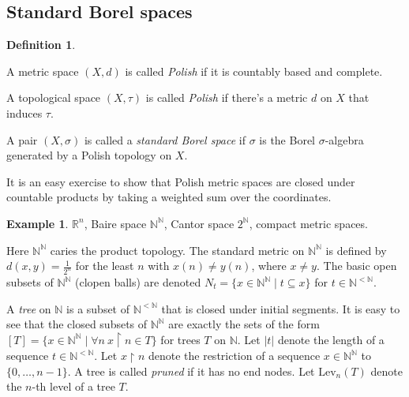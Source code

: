 \documentclass[10pt]{amsart}
\newcommand{\spl}{\mathrm{split}}
\newcommand{\RR}{\mathbb{R}}
\newcommand{\NN}{\mathbb{N}}
\newcommand{\Lev}{\mathrm{Lev}}
\theoremstyle{definition}
\newtheorem{definition}[theorem]{Definition}
\newtheorem{example}[theorem]{Example}
\theoremstyle{remark}
\newenvironment{enumerate-(a)}{\begin{enumerate}[label={\upshape (\alph*)}, leftmargin=2pc]}{\end{enumerate}}
\begin{document}
\subsection{Standard Borel spaces} 

\begin{definition} 
\begin{enumerate-(a)} 
\item 
A metric space $(X,d)$ is called \emph{Polish} if it is countably based and complete. 
\item 
A topological space $(X,\tau)$ is called \emph{Polish} if there's a metric $d$ on $X$ that induces $\tau$. 
\item 
A pair $(X,\sigma)$ is called a \emph{standard Borel space} if $\sigma$ is the Borel $\sigma$-algebra generated by a Polish topology on $X$.  
\end{enumerate-(a)} 
\end{definition} 

It is an easy exercise to show that Polish metric spaces are closed under countable products by taking a weighted sum over the coordinates. 

\begin{example} 
$\RR^n$, Baire space $\NN^\NN$,  Cantor space $2^\NN$, compact metric spaces. 
\end{example} 

Here $\NN^\NN$ caries the product topology. 
The standard metric on $\NN^\NN$ is defined by $d(x,y)=\frac{1}{2^n}$ for the least $n$ with $x(n)\neq y(n)$, where $x\neq y$. 
The basic open subsets of $\NN^\NN$ (clopen balls) are denoted $N_t=\{x\in \NN^\NN\mid t\subseteq x\}$ for $t\in \NN^{<\NN}$. 

A \emph{tree} on $\NN$ is a subset of $\NN^{<\NN}$ that is closed under initial segments. 
It is easy to see that the closed subsets of $\NN^\NN$ are exactly the sets of the form $[T]=\{x\in \NN^\NN\mid \forall n\ x{\upharpoonright}n \in T\}$ for trees $T$ on $\NN$. 
Let $|t|$ denote the length of a sequence $t\in \NN^{<\NN}$. 
Let $x{\upharpoonright}n$ denote the restriction of a sequence $x\in \NN^\NN$ to $\{0,\dots,n-1\}$. 
A tree is called \emph{pruned} if it has no end nodes. 
Let $\Lev_n(T)$ denote the $n$-th level of a tree $T$. 
\end{document}
